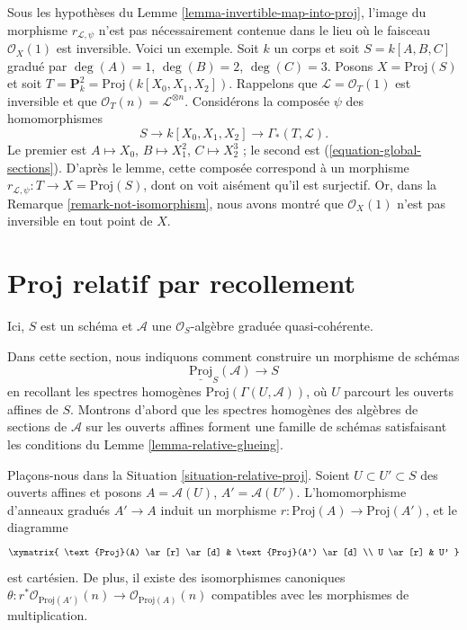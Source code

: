 \begin{remark}
\label{remark-not-in-invertible-locus}
Sous les hypothèses du Lemme \ref{lemma-invertible-map-into-proj}, l'image
du morphisme $r_{\mathcal{L}, \psi}$ n'est pas nécessairement contenue dans
le lieu où le faisceau $\mathcal{O}_X(1)$ est inversible. Voici un exemple.
Soit $k$ un corps et soit $S = k[A, B, C]$ gradué par
$\deg(A) = 1$, $\deg(B) = 2$, $\deg(C) = 3$.
Posons $X = \text{Proj}(S)$ et soit
$T = \mathbf{P}^2_k = \text{Proj}(k[X_0, X_1, X_2])$.
Rappelons que $\mathcal{L} = \mathcal{O}_T(1)$ est inversible et que
$\mathcal{O}_T(n) = \mathcal{L}^{\otimes n}$.
Considérons la composée $\psi$ des homomorphismes
$$
S \to k[X_0, X_1, X_2] \to \Gamma_*(T, \mathcal{L}).
$$
Le premier est $A \mapsto X_0$, $B \mapsto X_1^2$,
$C \mapsto X_2^3$ ;
le second est (\ref{equation-global-sections}). D'après le lemme, cette
composée correspond à un morphisme
$r_{\mathcal{L}, \psi} : T \to X = \text{Proj}(S)$, dont on voit aisément
qu'il est surjectif. Or, dans la Remarque \ref{remark-not-isomorphism},
nous avons montré que $\mathcal{O}_X(1)$
n'est pas inversible en tout point
de $X$.
\end{remark}










\section{Proj relatif par recollement}
\label{section-relative-proj-via-glueing}

\begin{situation}
\label{situation-relative-proj}
Ici, $S$ est un schéma et $\mathcal{A}$ une $\mathcal{O}_S$-algèbre graduée
quasi-cohérente.
\end{situation}

\noindent
Dans cette section, nous indiquons comment construire un morphisme de schémas
$$
\underline{\text{Proj}}_S(\mathcal{A}) \longrightarrow S
$$
en recollant les spectres homogènes $\text{Proj}(\Gamma(U, \mathcal{A}))$,
où $U$ parcourt les ouverts affines de $S$. Montrons d'abord que les spectres
homogènes des algèbres de sections de $\mathcal{A}$ sur les ouverts affines
forment une famille de schémas satisfaisant les conditions du
Lemme \ref{lemma-relative-glueing}.

\begin{lemma}
\label{lemma-proj-inclusion}
Plaçons-nous dans la Situation \ref{situation-relative-proj}.
Soient $U \subset U' \subset S$ des ouverts affines et posons
$A = \mathcal{A}(U)$, $A' = \mathcal{A}(U')$.
L'homomorphisme d'anneaux gradués $A' \to A$ induit un morphisme
$r : \text{Proj}(A) \to \text{Proj}(A')$, et le diagramme
$$
\xymatrix{
\text{Proj}(A) \ar[r] \ar[d] &
\text{Proj}(A') \ar[d] \\
U \ar[r] &
U'
}
$$ est cartésien. De plus, il existe des isomorphismes canoniques
$\theta : r^*\mathcal{O}_{\text{Proj}(A')}(n) \to
\mathcal{O}_{\text{Proj}(A)}(n)$ compatibles avec les morphismes de
multiplication.
\end{lemma}

